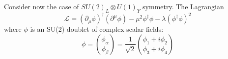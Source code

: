 Consider now the case of  $SU(2)_{L} \otimes U(1)_{Y}$ symmetry.
The Lagrangian
\begin{equation}
\mathcal{L} = (\partial_{\mu}\phi)^{\dagger}(\partial^{\mu}\phi)-\mu^{2}\phi^{\dagger}\phi-\lambda(\phi^{\dagger}\phi)^{2}
\label{L0_SU2}
\end{equation}
where $\phi$ is an SU(2) doublet of complex scalar fields:
\begin{equation}
\phi = {\phi_{\alpha} \choose \phi_{\beta}} = \frac{1}{\sqrt{2}}{\phi_{1}+i\phi_{2} \choose \phi_{3}+i\phi_{4}}
\label{phi_SU2}
\end{equation}

